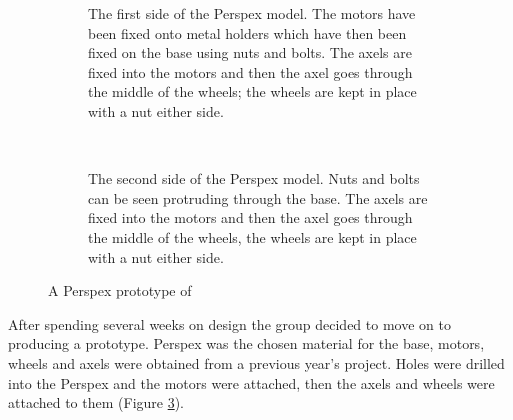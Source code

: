     \begin{figure}[htb]%
        \centering
        \begin{subfigure}[b]{0.45\textwidth}
            \caption{The first side of the Perspex model. The motors have been fixed onto metal holders which have then been fixed on the base using nuts and bolts. The axels are fixed into the motors and then the axel goes through the middle of the wheels; the wheels are kept in place with a nut either side.}
            \label{fig:wooden model 1}
        \end{subfigure}
        ~
        \begin{subfigure}[b]{0.45\textwidth}
            \caption{The second side of the Perspex model. Nuts and bolts can be seen protruding through the base. The axels are fixed into the motors and then the axel goes through the middle of the wheels, the wheels are kept in place with a nut either side.}
            \label{fig:wooden model 2}
        \end{subfigure}
        \caption{A Perspex prototype of \SandE}
        \label{fig:perspex prototype}
    \end{figure}
    After spending several weeks on design the group decided to move on to producing a prototype. Perspex was the chosen material for the base, motors, wheels and axels were obtained from a previous year's project. Holes were drilled into the Perspex and the motors were attached, then the axels and wheels were attached to them (Figure \ref{fig:perspex prototype}).

